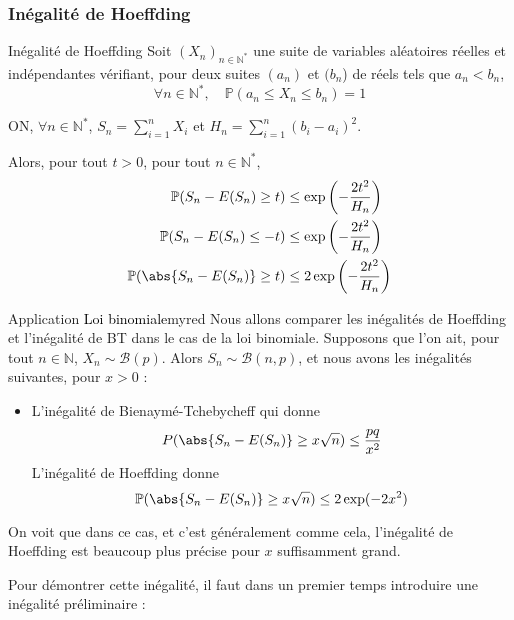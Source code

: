     \subsubsection{Inégalité de Hoeffding}

    \begin{theo}{Inégalité de Hoeffding}
        Soit $(X_n)_{n \in \mathbb{N}^*}$ une suite de variables aléatoires réelles et indépendantes vérifiant, pour deux suites $(a_n)$ et $(b_n$) de réels tels que $a_n < b_n$, 
        \[ \forall n \in \mathbb{N}^*, \quad \mathbb{P}(a_n \leq X_n \leq b_n) = 1 \]   
        
        ON, $\forall n \in \mathbb{N}^*$, $S_n = \sum_{i=1}^n X_i$ et $H_n = \sum_{i = 1}^n (b_i-a_i)^2$.

        Alors, pour tout $t > 0$, pour tout $n \in \mathbb{N}^*$, 
        \begin{align*}
            \mathbb{P}(S_n - E(S_n) \geq t) &\leq \exp\left(-\frac{2t^2}{H_n}\right) \\
            \mathbb{P}(S_n - E(S_n) \leq -t) &\leq \exp\left(-\frac{2t^2}{H_n}\right) \\
            \mathbb{P}(\abs{S_n - E(S_n)} \geq t) &\leq 2 \exp\left(-\frac{2t^2}{H_n}\right)
        \end{align*}
    \end{theo}

    \begin{omed}{Application \textcolor{black}{Loi binomiale}}{myred}
        Nous allons comparer les inégalités de Hoeffding et l’inégalité de BT dans le cas de la loi binomiale. Supposons que l’on ait, pour tout $n \in \mathbb{N}$, $X_n \sim \mathcal{B}(p)$. Alors $S_n \sim \mathcal{B}(n,p)$, et nous avons les inégalités suivantes, pour $x > 0$ : 
        \begin{itemize}
            \item L’inégalité de Bienaymé-Tchebycheff qui donne 
            \[ P(\abs{S_n - E(S_n)} \geq x \sqrt{n}) \leq \frac{pq}{x^2} \]   
            L’inégalité de Hoeffding donne 
            \[ \mathbb{P}(\abs{S_n - E(S_n)} \geq x \sqrt{n}) \leq 2 \exp(-2x^2) \]   
        \end{itemize}
        On voit que dans ce cas, et c’est généralement comme cela, l’inégalité de Hoeffding est beaucoup plus précise pour $x$ suffisamment grand.
    \end{omed}

    Pour démontrer cette inégalité, il faut dans un premier temps introduire une inégalité préliminaire :

